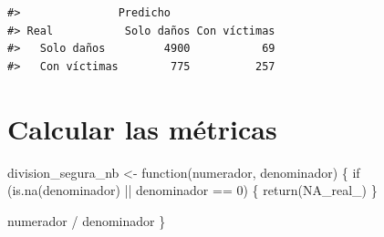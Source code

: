 \documentclass[
  spanish,
  10.5pt,
  letterpaper,
  openany,
  headings=big]{scrbook}
\newenvironment{Shaded}{}{}
\newcommand{\AttributeTok}[1]{\textcolor[rgb]{0.84,0.23,0.29}{#1}}
\newcommand{\ConstantTok}[1]{\textcolor[rgb]{0.00,0.36,0.77}{#1}}
\newcommand{\ControlFlowTok}[1]{\textcolor[rgb]{0.84,0.23,0.29}{#1}}
\newcommand{\DecValTok}[1]{\textcolor[rgb]{0.00,0.36,0.77}{#1}}
\newcommand{\FunctionTok}[1]{\textcolor[rgb]{0.44,0.26,0.76}{#1}}
\newcommand{\NormalTok}[1]{\textcolor[rgb]{0.14,0.16,0.18}{#1}}
\newcommand{\OtherTok}[1]{\textcolor[rgb]{0.44,0.26,0.76}{#1}}
\newcommand{\SpecialCharTok}[1]{\textcolor[rgb]{0.00,0.36,0.77}{#1}}
\begin{document}
\begin{Shaded}
\end{Shaded}

\begin{verbatim}
#>               Predicho
#> Real           Solo daños Con víctimas
#>   Solo daños         4900           69
#>   Con víctimas        775          257
\end{verbatim}

\section{Calcular las métricas}\label{calcular-las-muxe9tricas}

\begin{Shaded}
\begin{Highlighting}[]
\NormalTok{division\_segura\_nb }\OtherTok{\textless{}{-}} \ControlFlowTok{function}\NormalTok{(numerador, denominador) \{}
  \ControlFlowTok{if}\NormalTok{ (}\FunctionTok{is.na}\NormalTok{(denominador) }\SpecialCharTok{||}\NormalTok{ denominador }\SpecialCharTok{==} \DecValTok{0}\NormalTok{) \{}
    \FunctionTok{return}\NormalTok{(}\ConstantTok{NA\_real\_}\NormalTok{)}
\NormalTok{  \}}

\NormalTok{  numerador }\SpecialCharTok{/}\NormalTok{ denominador}
\NormalTok{\}}
\end{Highlighting}
\end{Shaded}
\end{document}
